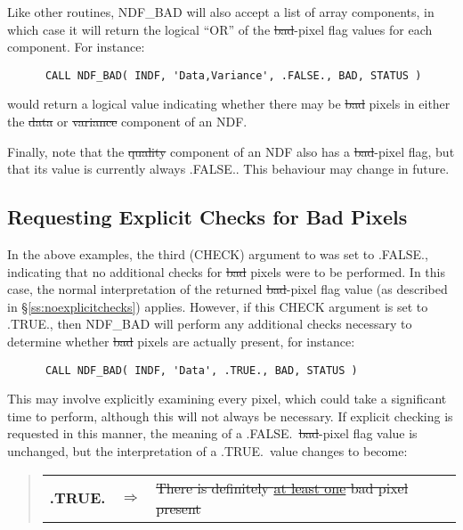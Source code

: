Like other routines, NDF\_BAD will also accept a list of array components,
in which case it will return the logical ``OR'' of the \st{bad\/}-pixel flag
values for each component. 
For instance:

\small
\begin{verbatim}
      CALL NDF_BAD( INDF, 'Data,Variance', .FALSE., BAD, STATUS )
\end{verbatim}
\normalsize

would return a logical value indicating whether there may be \st{bad\/}
pixels in either the \st{data\/} or \st{variance\/} component of an NDF. 

Finally, note that the \st{quality\/} component of an NDF also has a
\st{bad\/}-pixel flag, but that its value is currently always .FALSE..
This behaviour may change in future.

\subsection{\label{ss:badpixelabort}\label{ss:explicitchecks}Requesting Explicit Checks for Bad Pixels}

In the above examples, the third (CHECK) argument to  was set to
.FALSE., indicating that no additional checks for \st{bad\/} pixels were to
be performed. 
In this case, the normal interpretation of the returned \st{bad\/}-pixel flag
value (as described in \S\ref{ss:noexplicitchecks}) applies. 
However, if this CHECK argument is set to .TRUE., then NDF\_BAD will perform
any additional checks necessary to determine whether \st{bad\/} pixels are
actually present, for instance:

\small
\begin{verbatim}
      CALL NDF_BAD( INDF, 'Data', .TRUE., BAD, STATUS )
\end{verbatim}
\normalsize

This may involve explicitly examining every pixel, which could take a
significant time to perform, although this will not always be necessary. 
If explicit checking is requested in this manner, the meaning of a
.FALSE.\ \st{bad\/}-pixel flag value is unchanged, but the
interpretation of a .TRUE.\ value changes to become: 

\small
\begin{quote}
\begin{center}
\begin{tabular}{rcl}
{\bf .TRUE.} & $\Rightarrow$ & \st{There is definitely \underline{at least one}
bad pixel present} 
\end{tabular}
\end{center}
\end{quote}
\normalsize

